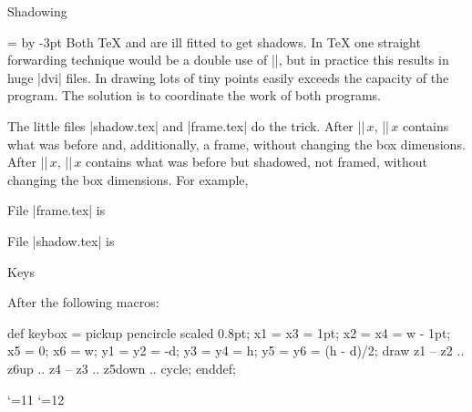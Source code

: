 \def\beginshadowpar{\setbox0=\vbox\bgroup \kern0.1pt
 \advance\parindent by -3pt \leftskip=3pt\rightskip=3pt }
\def\endshadowpar{\par\kern3pt\egroup\framebox0\shadowbox0\box0 }

\beginsection Shadowing

\beginshadowpar\noindent
Both {\TeX} and {\MF} are ill fitted to get shadows.  In {\TeX} one
straight forwarding technique would be a double use of |\leaders|, but in
practice this results in huge |dvi| files.  In {\MF} drawing lots of tiny
points easily exceeds the capacity of the program.  The solution is to
coordinate the work of both programs.
\endshadowpar

The little files |shadow.tex| and |frame.tex| do the trick.  After
|\framebox|$\,x$, |\box|$\,x$ contains what was before and,
additionally, a frame, without changing the box dimensions.  After
|\shadowbox|$\,x$, |\box|$\,x$ contains what was before but
shadowed, not framed, without changing the box dimensions.  For
example,


File |frame.tex| is

\beginlisting
{}
\endlisting

File |shadow.tex| is

\beginlisting
{}
\endlisting


\beginsection Keys

After the following {\MTeX} macros:


\MTcode
def keybox =
 pickup pencircle scaled 0.8pt;
 x1 = x3 = 1pt; x2 = x4 = w - 1pt; x5 = 0; x6 = w;
 y1 = y2 = -d; y3 = y4 = h; y5 = y6 = (h - d)/2;
 draw z1 -- z2 .. z6{up} .. z4 -- z3 .. z5{down} .. cycle;
enddef;

\catcode`\@=11
\def\defkey#1#2{\setbox0=\hbox{\sf#2}\count@=\MTn@
 \dimen0=\wd0\advance\dimen0 by 2pt
 \dimen2=\ht0\advance\dimen2 by 1pt
 \dimen4=\dp0\advance\dimen4 by 1pt
 \MTbeginchar(\the\dimen0,\the\dimen2,\the\dimen4);%
  \MTline{ keybox;}%
 \MTendchar;%
 \edef#1{\ifMTmf 
  \rlap{\kern1pt\sf#2}{\MTfont\char\the\count@}%
 \else           
  \ifcase\pdfoutput \special{psfile=auxiliar.\number\count@}%
  \else \ifMTf@le\noexpand\MPtoPDF{auxiliar.\number\count@}\fi
  \fi 
  \kern1pt{\sf#2}\kern1pt
 \fi}}
\catcode`\@=12

